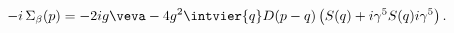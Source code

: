 \begin{equation}
\label{eq:olse}
 -i\,\Sigma_\beta(p)=
  -2ig\veva-4g^2\intvier{q} D(p-q)
  \left(S(q)+i\gamma^5S(q)i\gamma^5\right).
\end{equation}

